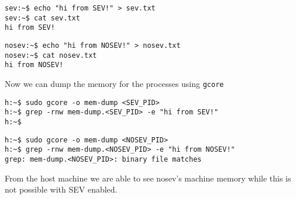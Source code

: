 \documentclass[twocolumn]{article}
\begin{document}
\begin{verbatim}
sev:~$ echo "hi from SEV!" > sev.txt
sev:~$ cat sev.txt
hi from SEV!
\end{verbatim}

\begin{verbatim}
nosev:~$ echo "hi from NOSEV!" > nosev.txt
nosev:~$ cat nosev.txt
hi from NOSEV!
\end{verbatim}

Now we can dump the memory for the processes using \texttt{gcore}

\begin{verbatim}
h:~$ sudo gcore -o mem-dump <SEV_PID>
h:~$ grep -rnw mem-dump.<SEV_PID> -e "hi from SEV!"
h:~$
\end{verbatim}

\begin{verbatim}
h:~$ sudo gcore -o mem-dump <NOSEV_PID>
h:~$ grep -rnw mem-dump.<NOSEV_PID> -e "hi from NOSEV!"
grep: mem-dump.<NOSEV_PID>: binary file matches
\end{verbatim}

From the host machine we are able to see nosev's machine memory while this is not possible with SEV enabled.
\end{document}

